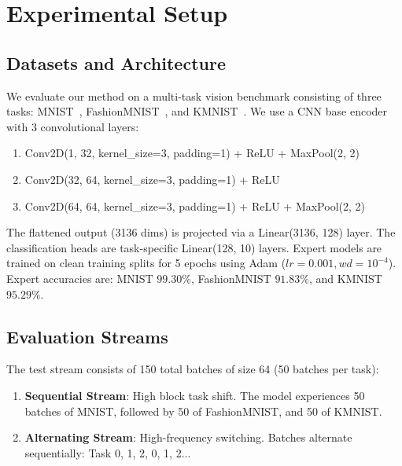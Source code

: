 \documentclass{article}
\theoremstyle{plain}
\theoremstyle{definition}
\theoremstyle{remark}
\begin{document}
\section{Experimental Setup}
\label{sec:experiments}

\subsection{Datasets and Architecture}
We evaluate our method on a multi-task vision benchmark consisting of three tasks: MNIST~\cite{lecun1998gradient}, FashionMNIST~\cite{xiao2017fashion}, and KMNIST~\cite{clanuwat2018deep}. We use a CNN base encoder with 3 convolutional layers:
\begin{enumerate}
    \item Conv2D(1, 32, kernel\_size=3, padding=1) + ReLU + MaxPool(2, 2)
    \item Conv2D(32, 64, kernel\_size=3, padding=1) + ReLU
    \item Conv2D(64, 64, kernel\_size=3, padding=1) + ReLU + MaxPool(2, 2)
\end{enumerate}
The flattened output (3136 dims) is projected via a Linear(3136, 128) layer. The classification heads are task-specific Linear(128, 10) layers. Expert models are trained on clean training splits for 5 epochs using Adam ($lr=0.001, wd=10^{-4}$). Expert accuracies are: MNIST $99.30\%$, FashionMNIST $91.83\%$, and KMNIST $95.29\%$.

\subsection{Evaluation Streams}
The test stream consists of 150 total batches of size 64 (50 batches per task):
\begin{enumerate}
    \item \textbf{Sequential Stream}: High block task shift. The model experiences 50 batches of MNIST, followed by 50 of FashionMNIST, and 50 of KMNIST.
    \item \textbf{Alternating Stream}: High-frequency switching. Batches alternate sequentially: Task 0, 1, 2, 0, 1, 2...
\end{enumerate}
\end{document}
